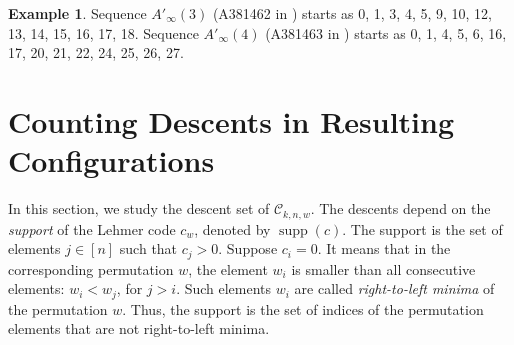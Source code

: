 \documentclass[final]{dmtcs-episciences}
\theoremstyle{definition}
\newtheorem{example}{Example}
\theoremstyle{remark}
\DeclareMathOperator{\supp}{supp}
\begin{document}
\begin{example}
    Sequence $A'_\infty(3)$ (A381462 in \cite{oeis}) starts as 0, 1, 3, 4, 5, 9, 10, 12, 13, 14, 15, 16, 17, 18. Sequence $A'_{\infty}(4)$ (A381463 in \cite{oeis}) starts as 0, 1, 4, 5, 6, 16, 17, 20, 21, 22, 24, 25, 26, 27.
 \end{example}










\section{Counting Descents in Resulting Configurations}
\label{sec:descents}

In this section, we study the descent set of $\mathcal{C}_{k, n, w}$. The descents depend on the \textit{support} of the Lehmer code $c_w$, denoted by $\supp(c)$. The support is the set of elements $j \in [n]$ such that $c_j > 0$. Suppose $c_i = 0$. It means that in the corresponding permutation $w$, the element $w_i$ is smaller than all consecutive elements: $w_i < w_j$, for $j > i$. Such elements $w_i$ are called \textit{right-to-left minima} of the permutation $w$. Thus, the support is the set of indices of the permutation elements that are not right-to-left minima.
\end{document}
